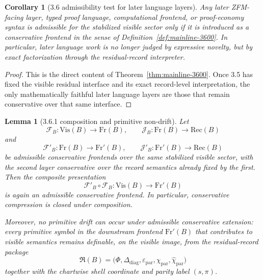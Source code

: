 \documentclass[12pt,a4paper]{article}
\newtheorem{lemma}[theorem]{Lemma}
\newtheorem{corollary}[theorem]{Corollary}
\begin{document}
\begin{corollary}[3.6 admissibility test for later language layers]
\label{cor:mainline-3600}
Any later ZFM-facing layer, typed proof language, computational frontend, or proof-economy syntax is admissible for the stabilized visible sector only if it is introduced as a conservative frontend in the sense of Definition~\ref{def:mainline-3600}. In particular, later language work is no longer judged by expressive novelty, but by exact factorization through the residual-record interpreter.
\end{corollary}

\begin{proof}
This is the direct content of Theorem~\ref{thm:mainline-3600}. Once 3.5 has fixed the visible residual interface and its exact record-level interpretation, the only mathematically faithful later language layers are those that remain conservative over that same interface.
\end{proof}

\begin{lemma}[3.6.1 composition and primitive non-drift]
\label{lem:mainline-3610}
Let
\[
 \mathcal F_B:\mathrm{Vis}(B)\to \mathrm{Fr}(B), \qquad
 \mathcal J_B:\mathrm{Fr}(B)\to \mathrm{Rec}(B)
\]
and
\[
 \mathcal F'_B:\mathrm{Fr}(B)\to \mathrm{Fr}'(B), \qquad
 \mathcal J'_B:\mathrm{Fr}'(B)\to \mathrm{Rec}(B)
\]
be admissible conservative frontends over the same stabilized visible sector, with the second layer conservative over the record semantics already fixed by the first. Then the composite presentation
\[
 \mathcal F'_B\circ \mathcal F_B:\mathrm{Vis}(B)\to \mathrm{Fr}'(B)
\]
is again an admissible conservative frontend. In particular, conservative compression is closed under composition.

Moreover, no primitive drift can occur under admissible conservative extension: every primitive symbol in the downstream frontend \(\mathrm{Fr}'(B)\) that contributes to visible semantics remains definable, on the visible image, from the residual-record package
\[
 \mathfrak R(B)=\bigl(\Phi,\Delta_{\mathrm{diag}},\varepsilon_{\mathrm{par}},\chi_{\mathrm{par}},\widehat\chi_{\mathrm{par}}\bigr)
\]
together with the chartwise shell coordinate and parity label \((s,\pi)\).
\end{lemma}
\end{document}
